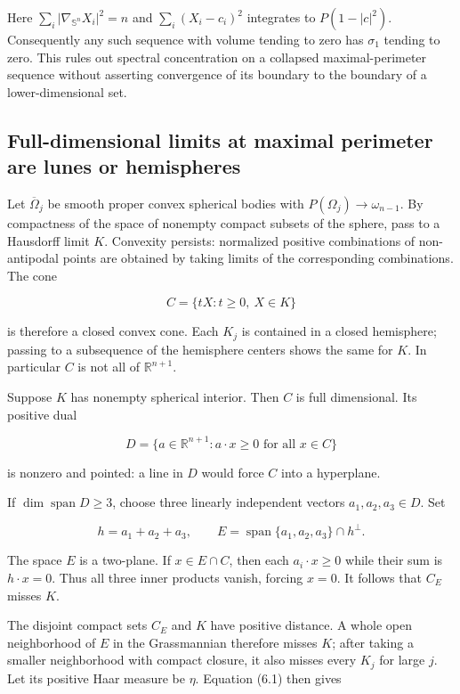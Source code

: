 \documentclass[11pt]{article}
\begin{document}
Here \(\sum_i|\nabla_{\mathbb S^n}X_i|^2=n\) and \(\sum_i(X_i-c_i)^2\)
integrates to \(P(1-|c|^2)\). Consequently any such sequence with volume
tending to zero has \(\sigma_1\) tending to zero. This rules out
spectral concentration on a collapsed maximal-perimeter sequence without
asserting convergence of its boundary to the boundary of a
lower-dimensional set.

\subsection{Full-dimensional limits at maximal perimeter are lunes or
hemispheres}\label{full-dimensional-limits-at-maximal-perimeter-are-lunes-or-hemispheres}

Let \(\overline\Omega_j\) be smooth proper convex spherical bodies with
\(P(\Omega_j)\to\omega_{n-1}\). By compactness of the space of nonempty
compact subsets of the sphere, pass to a Hausdorff limit \(K\).
Convexity persists: normalized positive combinations of non-antipodal
points are obtained by taking limits of the corresponding combinations.
The cone

\[
C=\{tX:t\geq0,\ X\in K\}
\tag{6.8}
\]

is therefore a closed convex cone. Each \(K_j\) is contained in a closed
hemisphere; passing to a subsequence of the hemisphere centers shows the
same for \(K\). In particular \(C\) is not all of \(\mathbb R^{n+1}\).

Suppose \(K\) has nonempty spherical interior. Then \(C\) is full
dimensional. Its positive dual

\[
D=\{a\in\mathbb R^{n+1}:a\cdot x\geq0\text{ for all }x\in C\}
\tag{6.9}
\]

is nonzero and pointed: a line in \(D\) would force \(C\) into a
hyperplane.

If \(\dim\operatorname{span}D\geq3\), choose three linearly independent
vectors \(a_1,a_2,a_3\in D\). Set

\[
h=a_1+a_2+a_3,\qquad
E=\operatorname{span}\{a_1,a_2,a_3\}\cap h^\perp.
\tag{6.10}
\]

The space \(E\) is a two-plane. If \(x\in E\cap C\), then each
\(a_i\cdot x\geq0\) while their sum is \(h\cdot x=0\). Thus all three
inner products vanish, forcing \(x=0\). It follows that \(C_E\) misses
\(K\).

The disjoint compact sets \(C_E\) and \(K\) have positive distance. A
whole open neighborhood of \(E\) in the Grassmannian therefore misses
\(K\); after taking a smaller neighborhood with compact closure, it also
misses every \(K_j\) for large \(j\). Let its positive Haar measure be
\(\eta\). Equation (6.1) then gives
\end{document}
